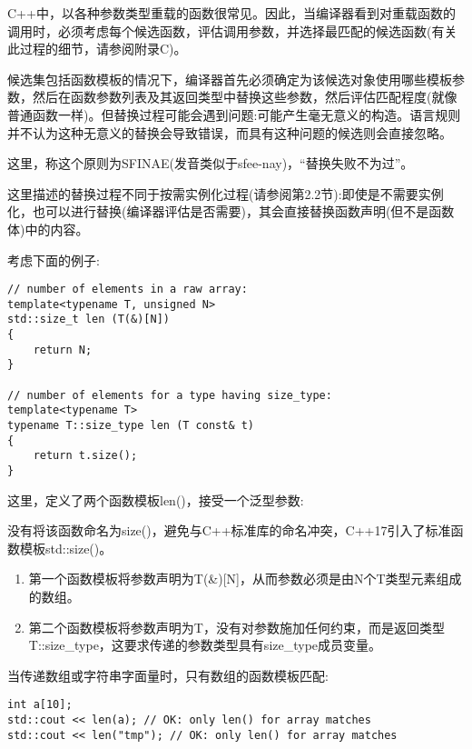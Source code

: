 
C++中，以各种参数类型重载的函数很常见。因此，当编译器看到对重载函数的调用时，必须考虑每个候选函数，评估调用参数，并选择最匹配的候选函数(有关此过程的细节，请参阅附录C)。

候选集包括函数模板的情况下，编译器首先必须确定为该候选对象使用哪些模板参数，然后在函数参数列表及其返回类型中替换这些参数，然后评估匹配程度(就像普通函数一样)。但替换过程可能会遇到问题:可能产生毫无意义的构造。语言规则并不认为这种无意义的替换会导致错误，而具有这种问题的候选则会直接忽略。

这里，称这个原则为SFINAE(发音类似于sfee-nay)，“替换失败不为过”。

这里描述的替换过程不同于按需实例化过程(请参阅第2.2节):即使是不需要实例化，也可以进行替换(编译器评估是否需要)，其会直接替换函数声明(但不是函数体)中的内容。

考虑下面的例子:

\begin{lstlisting}[style=styleCXX]
// number of elements in a raw array:
template<typename T, unsigned N>
std::size_t len (T(&)[N])
{
	return N;
}

// number of elements for a type having size_type:
template<typename T>
typename T::size_type len (T const& t)
{
	return t.size();
}
\end{lstlisting}

这里，定义了两个函数模板len()，接受一个泛型参数:

\begin{tcolorbox}[colback=webgreen!5!white,colframe=webgreen!75!black]
\hspace*{0.75cm}没有将该函数命名为size()，避免与C++标准库的命名冲突，C++17引入了标准函数模板std::size()。
\end{tcolorbox}

\begin{enumerate}
\item 
第一个函数模板将参数声明为T(\&)[N]，从而参数必须是由N个T类型元素组成的数组。

\item 
第二个函数模板将参数声明为T，没有对参数施加任何约束，而是返回类型T::size\_type，这要求传递的参数类型具有size\_type成员变量。
\end{enumerate}

当传递数组或字符串字面量时，只有数组的函数模板匹配:

\begin{lstlisting}[style=styleCXX]
int a[10];
std::cout << len(a); // OK: only len() for array matches
std::cout << len("tmp"); // OK: only len() for array matches
\end{lstlisting}

